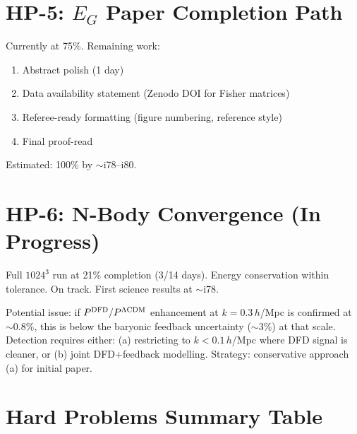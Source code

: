 \documentclass[11pt,a4paper]{article}
\begin{document}
\section{HP-5: $E_G$ Paper Completion Path}

Currently at 75\%. Remaining work:
\begin{enumerate}[nosep]
\item Abstract polish (1 day)
\item Data availability statement (Zenodo DOI for Fisher matrices)
\item Referee-ready formatting (figure numbering, reference style)
\item Final proof-read
\end{enumerate}

Estimated: 100\% by $\sim$i78--i80.

\section{HP-6: N-Body Convergence (In Progress)}

Full $1024^3$ run at 21\% completion (3/14 days). Energy conservation within tolerance. On track. First science results at $\sim$i78.

Potential issue: if $P^{\rm DFD}/P^{\rm \Lambda CDM}$ enhancement at $k = 0.3\,h$/Mpc is confirmed at $\sim 0.8\%$, this is below the baryonic feedback uncertainty ($\sim 3\%$) at that scale. Detection requires either: (a) restricting to $k < 0.1\,h$/Mpc where DFD signal is cleaner, or (b) joint DFD+feedback modelling. Strategy: conservative approach (a) for initial paper.

\section{Hard Problems Summary Table}
\end{document}

